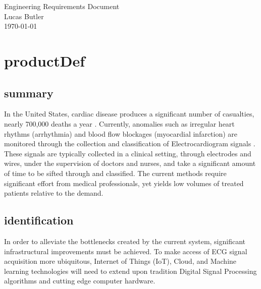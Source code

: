 \documentclass{article}
\begin{document}
\pagestyle{empty}

\vspace*{\fill}   %

\begin{center}
    {\LARGE Engineering Requirements Document \\}   %
    \vspace{1cm}         %
    {\large Lucas Butler \\}  %
    \vspace{1cm}         %
    {\large \today}      %
\end{center}

\vspace*{\fill}   %


\newpage

\setcounter{page}{1}
\pagestyle{plain}

\printglossaries
\newpage

\section{\gls{productDef}}
\subsection{\gls{summary}}
\quad In the United States, cardiac disease produces a significant number of casualties, nearly 700,000 deaths a year \cite{cdc}. Currently, anomalies such as irregular heart rhythms (arrhythmia) and blood flow blockages (myocardial infarction) are monitored through the collection and classification of Electrocardiogram signals \cite{typesofcardiac}. These signals are typically collected in a clinical setting, through electrodes and wires, under the supervision of doctors and nurses, and take a significant amount of time to be sifted through and classified. The current methods require significant effort from medical professionals, yet yields low volumes of treated patients relative to the demand. 
\subsection{\gls{identification}}
In order to alleviate the bottlenecks created by the current system, significant infrastructural improvements must be achieved. To make access of ECG signal acquisition more ubiquitous, Internet of Things (IoT), Cloud, and Machine learning technologies will need to extend upon tradition Digital Signal Processing algorithms and cutting edge computer hardware.
\end{document}
